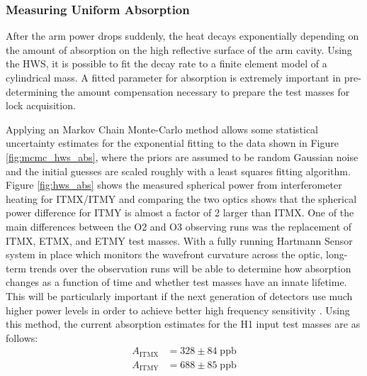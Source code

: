 	\subsubsection{Measuring Uniform Absorption}
	After the arm power drops suddenly, the heat decays exponentially depending on the amount of absorption on the high reflective surface of the arm cavity.  Using the HWS, it is possible to fit the decay rate to a finite element model of a cylindrical mass.  A fitted parameter for absorption is extremely important in pre-determining the amount compensation necessary to prepare the test masses for lock acquisition.  
	
	Applying an Markov Chain Monte-Carlo method allows some statistical uncertainty estimates for the exponential fitting to the data shown in Figure \ref{fig:mcmc_hws_abs}, where the priors are assumed to be random Gaussian noise and the initial guesses are scaled roughly with a least squares fitting algorithm. Figure \ref{fig:hws_abs} shows the measured spherical power from interferometer heating for ITMX/ITMY and comparing the two optics shows that the spherical power difference for ITMY is almost a factor of 2 larger than ITMX. One of the main differences between the O2 and O3 observing runs was the replacement of ITMX, ETMX, and ETMY test masses.  With a fully running Hartmann Sensor system in place which monitors the wavefront curvature across the optic, long-term trends over the observation runs will be able to determine how absorption changes as a function of time and whether test masses have an innate lifetime.  This will be particularly important if the next generation of detectors use much higher power levels in order to achieve better high frequency sensitivity \cite{DanBrown_prvt}.  Using this method, the current absorption estimates for the H1 input test masses are as follows:
	\begin{equation}
	\begin{aligned}
	A_{\text{ITMX}} &= 328 \pm 84 \; \text{ppb}\\
	A_{\text{ITMY}} &= 688 \pm 85 \; \text{ppb}
	\end{aligned}
	\end{equation}
